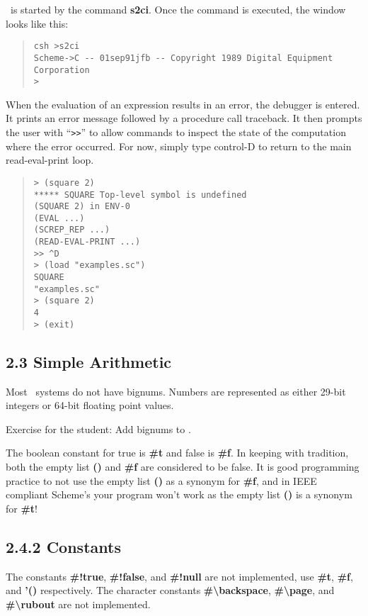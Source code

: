 \documentclass[10pt]{article}
\begin{document}
\StoC\ is started by the command \textbf{s2ci}.  Once the command
is executed, the window looks like this:

\begin{quote}
\begin{verbatim}
csh >s2ci
Scheme->C -- 01sep91jfb -- Copyright 1989 Digital Equipment Corporation
>
\end{verbatim}
\end{quote}

When the evaluation of an expression results in an error, the
debugger is entered.  It prints an error message followed by a
procedure call traceback.  It then prompts the user with ``\texttt{>>}''
to allow commands to inspect the state of the computation
where the error occurred.  For now, simply type control-D to
return to the main read-eval-print loop.
\begin{quote}
\begin{verbatim}
> (square 2)
***** SQUARE Top-level symbol is undefined
(SQUARE 2) in ENV-0
(EVAL ...)
(SCREP_REP ...)
(READ-EVAL-PRINT ...)
>> ^D
> (load "examples.sc")
SQUARE
"examples.sc"
> (square 2)
4
> (exit)
\end{verbatim}
\end{quote}

\subsection*{2.3 Simple Arithmetic}

Most \StoC\ systems do not have bignums.  Numbers are
represented as either 29-bit integers or 64-bit floating point
values.

Exercise for the student:  Add bignums to \StoC.

The boolean constant for true is \textbf{\#t} and false is \textbf{\#f}.
In keeping with tradition, both the empty list \textbf{()} and \textbf{\#f}
are considered to be false.  It is good programming practice
to not use the empty list \textbf{()} as a synonym for \textbf{\#f}, and in
IEEE compliant Scheme's your program won't work as the empty
list \textbf{()} is a synonym for \textbf{\#t}!

\subsection*{2.4.2 Constants}

The constants \textbf{\#!true}, \textbf{\#!false}, and \textbf{\#!null} are not implemented,
use \textbf{\#t}, \textbf{\#f}, and \textbf{'()} respectively. The character
constants \textbf{\#\textbackslash{}backspace}, \textbf{\#\textbackslash{}page}, and \textbf{\#\textbackslash{}rubout} are not
implemented.
\end{document}
